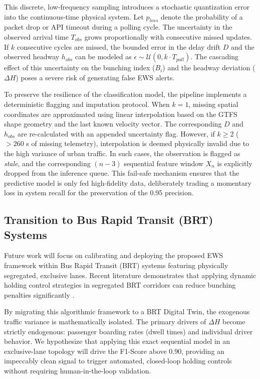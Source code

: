 \documentclass[journal,twocolumn]{IEEEtran}
\begin{document}
This discrete, low-frequency sampling introduces a stochastic quantization error into the continuous-time physical system. Let $p_{loss}$ denote the probability of a packet drop or API timeout during a polling cycle. The uncertainty in the observed arrival time $T_{obs}$ grows proportionally with consecutive missed updates. If $k$ consecutive cycles are missed, the bounded error in the delay drift $D$ and the observed headway $h_{obs}$ can be modeled as $\epsilon \sim \mathcal{U}(0, k \cdot T_{poll})$. The cascading effect of this uncertainty on the bunching index ($B_i$) and the headway deviation ($\Delta H$) poses a severe risk of generating false EWS alerts.

To preserve the resilience of the classification model, the pipeline implements a deterministic flagging and imputation protocol. When $k=1$, missing spatial coordinates are approximated using linear interpolation based on the GTFS shape geometry and the last known velocity vector. The corresponding $D$ and $h_{obs}$ are re-calculated with an appended uncertainty flag. However, if $k \ge 2$ ($> 260$ s of missing telemetry), interpolation is deemed physically invalid due to the high variance of urban traffic. In such cases, the observation is flagged as \textit{stale}, and the corresponding $(n-3)$ sequential feature window $X_n$ is explicitly dropped from the inference queue. This fail-safe mechanism ensures that the predictive model is only fed high-fidelity data, deliberately trading a momentary loss in system recall for the preservation of the 0.95 precision.

\subsection{Transition to Bus Rapid Transit (BRT) Systems}
Future work will focus on calibrating and deploying the proposed EWS framework within Bus Rapid Transit (BRT) systems featuring physically segregated, exclusive lanes. Recent literature demonstrates that applying dynamic holding control strategies in segregated BRT corridors can reduce bunching penalties significantly \cite{10, 29}.

By migrating this algorithmic framework to a BRT Digital Twin, the exogenous traffic variance is mathematically isolated. The primary drivers of $\Delta H$ become strictly endogenous: passenger boarding rates (dwell times) and individual driver behavior. We hypothesize that applying this exact sequential model in an exclusive-lane topology will drive the F1-Score above 0.90, providing an impeccably clean signal \cite{30} to trigger automated, closed-loop holding controls \cite{10} without requiring human-in-the-loop validation.
\end{document}
